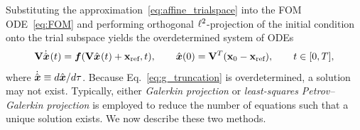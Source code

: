 \documentclass[3p,computermodern,10pt]{elsarticle}
\begin{document}
Substituting the approximation~\eqref{eq:affine_trialspace} into the FOM ODE~\eqref{eq:FOM} and performing orthogonal
$\ell^2$-projection of the initial condition onto the trial subspace yields
the overdetermined system of ODEs
\begin{equation}\label{eq:g_truncation}
\mathbf {V} \dot{\hat{ \boldsymbol x}}^{}(t) = \boldsymbol f(\mathbf {V}
\hat{ \boldsymbol x}^{}(t) + \mathbf{x}_\text{ref},t ), \qquad \hat{ \boldsymbol x}(0) = \mathbf {V}^T( {{\mathbf{x}}_0} - \mathbf{x}_\text{ref}),
	\qquad t \in [0,T],
\end{equation}
where $\dot{\hat{ \boldsymbol x}}\equiv {d \hat{ \boldsymbol x}}/{d\tau}$.
Because Eq.~\eqref{eq:g_truncation} is overdetermined, a solution may not
exist. Typically, either \textit{Galerkin projection} or \textit{least-squares
Petrov--Galerkin projection} is employed to reduce the number of equations
such that a unique solution exists. We now describe these two methods.
\end{document}
